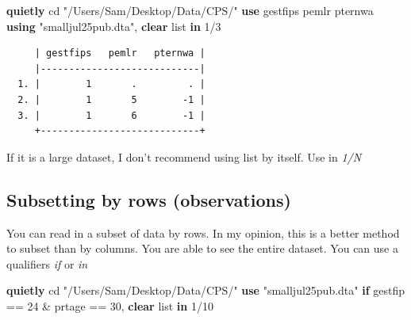 \documentclass[
]{book}
\newenvironment{Shaded}{\begin{snugshade}}{\end{snugshade}}
\newcommand{\KeywordTok}[1]{\textcolor[rgb]{0.13,0.29,0.53}{\textbf{#1}}}
\newcommand{\NormalTok}[1]{#1}
\newcommand{\OtherTok}[1]{\textcolor[rgb]{0.56,0.35,0.01}{#1}}
\newcommand{\StringTok}[1]{\textcolor[rgb]{0.31,0.60,0.02}{#1}}
\begin{document}
\begin{Shaded}
\begin{Highlighting}[]
\KeywordTok{quietly}\NormalTok{ cd }\StringTok{"/Users/Sam/Desktop/Data/CPS/"}
\KeywordTok{use}\NormalTok{ gestfips pemlr pternwa }\KeywordTok{using} \StringTok{"smalljul25pub.dta"}\NormalTok{, }\KeywordTok{clear}
\OtherTok{list} \KeywordTok{in}\NormalTok{ 1/3}
\end{Highlighting}
\end{Shaded}

\begin{verbatim}
     | gestfips   pemlr   pternwa |
     |----------------------------|
  1. |        1       .         . |
  2. |        1       5        -1 |
  3. |        1       6        -1 |
     +----------------------------+
\end{verbatim}

If it is a large dataset, I don't recommend using list by itself. Use in \emph{1/N}

\subsection{Subsetting by rows (observations)}\label{subsetting-by-rows-observations}

You can read in a subset of data by rows. In my opinion, this is a better method to subset than by columns. You are able to see the entire dataset. You can use a qualifiers \emph{if} or \emph{in}

\begin{Shaded}
\begin{Highlighting}[]
\KeywordTok{quietly}\NormalTok{ cd }\StringTok{"/Users/Sam/Desktop/Data/CPS/"}
\KeywordTok{use} \StringTok{"smalljul25pub.dta"} \KeywordTok{if}\NormalTok{ gestfip == 24 \& prtage == 30, }\KeywordTok{clear}
\OtherTok{list} \KeywordTok{in}\NormalTok{ 1/10}
\end{Highlighting}
\end{Shaded}
\end{document}
